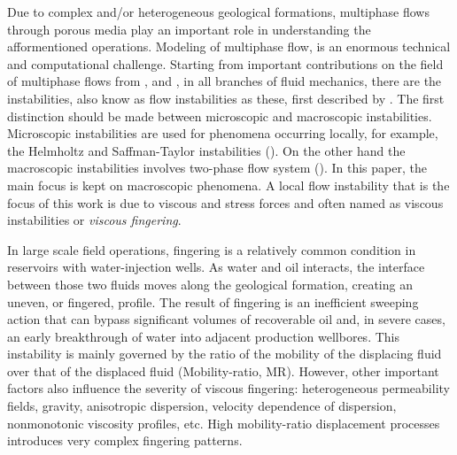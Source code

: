 \documentclass[preprint,authoryear,12pt]{elsarticle}
\begin{document}
\medskip
Due to complex and/or heterogeneous geological formations, multiphase flows through porous media play an important role in understanding the afformentioned operations. Modeling of multiphase flow, is an enormous technical and computational challenge. Starting from important contributions on the field of multiphase flows from \citet{wooding_1976}, \citet{homsy_1987} and \citet{adler_1988}, in all branches of fluid mechanics, there are the instabilities, also know as flow instabilities as these, first described by \citet{saffman_1958}. The first distinction should be made between microscopic and macroscopic instabilities. Microscopic instabilities are used for phenomena occurring locally, for example, the Helmholtz and Saffman-Taylor instabilities (\citep{saffman_1959}). On the other hand the macroscopic instabilities involves two-phase flow system (\citep{bottoni_1992}). In this paper, the main focus is kept on macroscopic phenomena. A local flow instability that is the focus of this work is due to viscous and stress forces and often named as viscous instabilities or \textit{viscous fingering}. 

\medskip
In large scale field operations, fingering is a relatively common condition in reservoirs with water-injection wells. As water and oil interacts, the interface between those two fluids moves along the geological formation, creating an uneven, or fingered, profile. The result of fingering is an inefficient sweeping action that can bypass significant volumes of recoverable oil and, in severe cases, an early breakthrough of water into adjacent production wellbores. This instability is mainly governed by the ratio of the mobility of the displacing fluid over that of the displaced fluid (Mobility-ratio, MR). %
However, other important factors also influence the severity of viscous fingering: heterogeneous permeability fields, gravity, anisotropic dispersion, velocity dependence of dispersion, nonmonotonic viscosity profiles, etc. High mobility-ratio displacement processes introduces very complex fingering patterns.  

\end{document}
